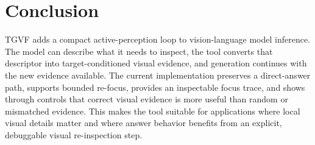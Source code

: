 \documentclass[10pt,twocolumn]{article}
\newcommand{\method}{TGVF}
\begin{document}
\section{Conclusion}

\method{} adds a compact active-perception loop to vision-language model inference. The model can describe what it needs to inspect, the tool converts that descriptor into target-conditioned visual evidence, and generation continues with the new evidence available. The current implementation preserves a direct-answer path, supports bounded re-focus, provides an inspectable focus trace, and shows through controls that correct visual evidence is more useful than random or mismatched evidence. This makes the tool suitable for applications where local visual details matter and where answer behavior benefits from an explicit, debuggable visual re-inspection step.
\end{document}
